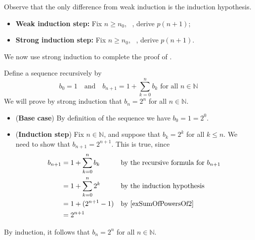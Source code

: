 \begin{center}
\end{center}

Observe that the only difference from weak induction is the induction hypothesis.
\begin{itemize}
\item \textbf{Weak induction step:} Fix $n \ge n_0$, ~, derive $p(n+1)$;
\item \textbf{Strong induction step:} Fix $n \ge n_0$, ~, derive $p(n+1)$.
\end{itemize}

We now use strong induction to complete the proof of .

\begin{example}
Define a sequence recursively by
\[ b_0 = 1 \quad \text{and} \quad b_{n+1} = 1 + \sum_{k=0}^n b_k \text{ for all } n \in \mathbb{N} \]
We will prove by strong induction that $b_n = 2^n$ for all $n \in \mathbb{N}$.

\begin{itemize}
\item (\textbf{Base case}) By definition of the sequence we have $b_0=1=2^0$.
\item (\textbf{Induction step}) Fix $n \in \mathbb{N}$, and suppose that $b_k=2^k$ for all $k \le n$. We need to show that $b_{n+1}=2^{n+1}$. This is true, since
\begin{align*}
b_{n+1} &= 1 + \sum_{k=0}^n b_k && \text{by the recursive formula for $b_{n+1}$} \\
&= 1 + \sum_{k=0}^n 2^k && \text{by the induction hypothesis} \\
&= 1 + (2^{n+1}-1) && \text{by \Cref{exSumOfPowersOf2}} \\
&= 2^{n+1}
\end{align*}
\end{itemize}
By induction, it follows that $b_n=2^n$ for all $n \in \mathbb{N}$.
\end{example}

